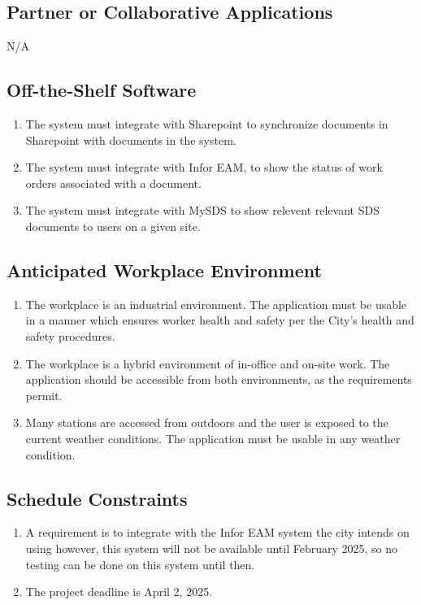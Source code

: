 \documentclass[12pt]{article}
\begin{document}
\subsection{Partner or Collaborative Applications}
N/A
\subsection{Off-the-Shelf Software}
\begin{enumerate} [{C-OTS}1.]
  \item The system must integrate with Sharepoint to synchronize documents in
  Sharepoint with documents in the system.
  \item The system must integrate with Infor EAM, to show the status of work
  orders associated with a document.
  \item The system must integrate with MySDS to show relevent relevant SDS
  documents to users on a given site.
\end{enumerate}

\subsection{Anticipated Workplace Environment}
\begin{enumerate} [{C-AWE}1.]
    \item The workplace is an industrial environment. The application must
    be usable in a manner which ensures worker health and safety per the 
    City's health and safety procedures.
    \item The workplace is a hybrid environment of in-office and on-site
    work. The application should be accessible from both environments, as
    the requirements permit.
    \item Many stations are accessed from outdoors and the user is exposed to
    the current weather conditions. The application must be usable in any
    weather condition.
\end{enumerate}

\subsection{Schedule Constraints}
\begin{enumerate} [{C-SCH}1.]
  \item A requirement is to integrate with the Infor EAM system the city intends
  on using however, this system will not be available until February 2025, so no
  testing can be done on this system until then.

  \item The project deadline is April 2, 2025.
\end{enumerate}
\end{document}
